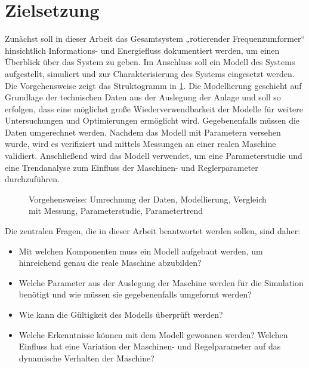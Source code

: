 \section{Zielsetzung}
\label{sec:Zielsetzung}
Zunächst soll in dieser Arbeit das Gesamtsystem „rotierender Frequenzumformer“ hinsichtlich Informations- und Energiefluss dokumentiert werden, um einen Überblick über das System zu geben. Im Anschluss soll ein Modell des Systems aufgestellt, simuliert und zur Charakterisierung des Systems eingesetzt werden. Die Vorgehensweise zeigt das Struktogramm in \cref{fig:StrukturArbeit}.   Die Modellierung geschieht auf Grundlage der technischen Daten aus der Auslegung der Anlage und soll so erfolgen, dass eine möglichst große Wiederverwendbarkeit der Modelle für weitere Untersuchungen und Optimierungen ermöglicht wird.  Gegebenenfalls müssen die Daten umgerechnet werden. Nachdem das Modell mit Parametern versehen wurde, wird es verifiziert und mittels Messungen an einer realen Maschine validiert. Anschließend wird das Modell verwendet, um eine Parameterstudie und eine Trendanalyse zum Einfluss der Maschinen- und Reglerparameter durchzuführen. 
\begin{figure}
	\centering
	
	\caption{Vorgehensweise: Umrechnung der Daten, Modellierung, Vergleich mit Messung, Parameterstudie, Parametertrend}
	\label{fig:StrukturArbeit}
\end{figure}
Die zentralen Fragen, die in dieser Arbeit beantwortet werden sollen, sind daher:
\begin{itemize}
\item Mit welchen Komponenten muss ein Modell aufgebaut werden, um hinreichend genau die reale Maschine abzubilden?
\item Welche Parameter aus der Auslegung der Maschine werden für die Simulation benötigt und wie müssen sie gegebenenfalls umgeformt werden?
\item Wie kann die Gültigkeit des Modells überprüft werden?
\item Welche Erkenntnisse können mit dem Modell gewonnen werden? Welchen Einfluss hat eine Variation der Maschinen- und Regelparameter auf das dynamische Verhalten der Maschine?
\end{itemize}

